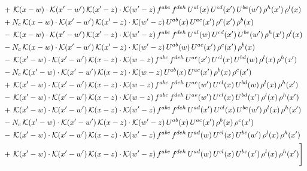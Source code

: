\documentclass[9pt]{article}
\numberwithin{equation}{section}
\begin{document}
\begin{align}
& +\,\mathcal{K}(x-w)\cdot\mathcal{K}(x'-w')\,\mathcal{K}(x'-z)\cdot\mathcal{K}(w'-z)\,f^{abc}\,f^{deh}\,U^{al}(x)\,U^{cd}(x')\,U^{be}(w')\,\rho^{h}(x')\,\rho^{l}(x)\notag\\
& +N_{c}\,\mathcal{K}(x-w)\cdot\mathcal{K}(x'-w')\,\mathcal{K}(x'-z)\cdot\mathcal{K}(w'-z)\,U^{ab}(x)\,U^{ac}(x')\,\rho^{c}(x')\,\rho^{b}(x)\notag\\
& -\,\mathcal{K}(x-w)\cdot\mathcal{K}(x'-w')\,\mathcal{K}(x'-z)\cdot\mathcal{K}(w'-z)\,f^{abc}\,f^{deh}\,U^{al}(w)\,U^{cd}(x')\,U^{be}(w')\,\rho^{h}(x')\,\rho^{l}(x)\notag\\
& -N_{c}\,\mathcal{K}(x-w)\cdot\mathcal{K}(x'-w')\,\mathcal{K}(x'-z)\cdot\mathcal{K}(w'-z)\,U^{ab}(w)\,U^{ac}(x')\,\rho^{c}(x')\,\rho^{b}(x)\notag\\
& -\,\mathcal{K}(x'-w)\cdot\mathcal{K}(x'-w')\,\mathcal{K}(x-z)\cdot\mathcal{K}(w-z)\,f^{abc}\,f^{deh}\,U^{ae}(x')\,U^{cl}(x)\,U^{bd}(w)\,\rho^{l}(x)\,\rho^{h}(x')\notag\\
& -N_{c}\,\mathcal{K}(x'-w)\cdot\mathcal{K}(x'-w')\,\mathcal{K}(x-z)\cdot\mathcal{K}(w-z)\,U^{ab}(x)\,U^{ac}(x')\,\rho^{b}(x)\,\rho^{c}(x')\notag\\
& +\,\mathcal{K}(x'-w)\cdot\mathcal{K}(x'-w')\,\mathcal{K}(x-z)\cdot\mathcal{K}(w-z)\,f^{abc}\,f^{deh}\,U^{ae}(w')\,U^{cl}(x)\,U^{bd}(w)\,\rho^{l}(x)\,\rho^{h}(x')\notag\\
& -\,\mathcal{K}(x'-w)\cdot\mathcal{K}(x'-w')\,\mathcal{K}(x-z)\cdot\mathcal{K}(w-z)\,f^{abc}\,f^{deh}\,U^{ae}(w')\,U^{cl}(x)\,U^{bd}(x')\,\rho^{l}(x)\,\rho^{h}(x')\notag\\
& +\,\mathcal{K}(x'-w)\cdot\mathcal{K}(x'-w')\,\mathcal{K}(x-z)\cdot\mathcal{K}(w'-z)\,f^{abc}\,f^{deh}\,U^{ad}(x')\,U^{cl}(x)\,U^{be}(w')\,\rho^{l}(x)\,\rho^{h}(x')\notag\\
& -N_{c}\,\mathcal{K}(x'-w)\cdot\mathcal{K}(x'-w')\,\mathcal{K}(x-z)\cdot\mathcal{K}(w'-z)\,U^{ab}(x)\,U^{ac}(x')\,\rho^{b}(x)\,\rho^{c}(x')\notag\\
& -\,\mathcal{K}(x'-w)\cdot\mathcal{K}(x'-w')\,\mathcal{K}(x-z)\cdot\mathcal{K}(w'-z)\,f^{abc}\,f^{deh}\,U^{ad}(w)\,U^{cl}(x)\,U^{be}(w')\,\rho^{l}(x)\,\rho^{h}(x')\notag\\
& +\,\mathcal{K}(x'-w)\cdot\mathcal{K}(x'-w')\,\mathcal{K}(x-z)\cdot\mathcal{K}(w'-z)\,f^{abc}\,f^{deh}\,U^{ad}(w)\,U^{cl}(x)\,U^{be}(x')\,\rho^{l}(x)\,\rho^{h}(x')\Bigg]
\end{align}
\end{document}
